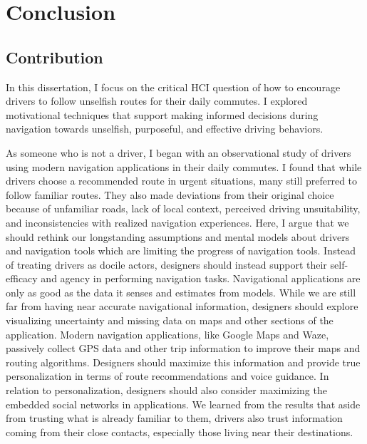 \chapter{Conclusion}
\label{conclusion}

\section{Contribution}
In this dissertation, I focus on the critical HCI question of how to encourage drivers to follow unselfish routes for their daily commutes. I explored motivational techniques that support making informed decisions during navigation towards unselfish, purposeful, and effective driving behaviors. 

As someone who is not a driver, I began with an observational study of drivers using modern navigation applications in their daily commutes. I found that while drivers choose a recommended route in urgent situations, many still preferred to follow familiar routes. They also made deviations from their original choice because of unfamiliar roads, lack of local context, perceived driving unsuitability, and inconsistencies with realized navigation experiences. Here, I argue that we should rethink our longstanding assumptions and mental models about drivers and navigation tools which are limiting the progress of navigation tools. Instead of treating drivers as docile actors, designers should instead support their self-efficacy and agency in performing navigation tasks. Navigational applications are only as good as the data it senses and estimates from models. While we are still far from having near accurate navigational information, designers should explore visualizing uncertainty and missing data on maps and other sections of the application. Modern navigation applications, like Google Maps and Waze, passively collect GPS data and other trip information to improve their maps and routing algorithms. Designers should maximize this information and provide true personalization in terms of route recommendations and voice guidance. In relation to personalization, designers should also consider maximizing the embedded social networks in applications. We learned from the results that aside from trusting what is already familiar to them, drivers also trust information coming from their close contacts, especially those living near their destinations. 

